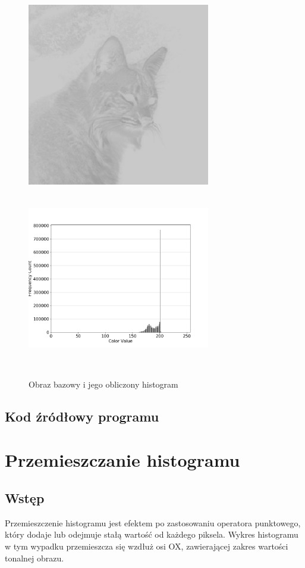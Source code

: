 \documentclass[a4paper,12pt]{book}
\begin{document}
\begin{figure}[H]
	\label{fig:cat-bright-histogram}
	\caption{Obraz bazowy i jego obliczony histogram}
	\includegraphics[width=8cm, height=8cm]{cat-bright-unmodified.png}
	\includegraphics[width=8cm, height=8cm]{5-1/calculate-cat-bright.png}
\end{figure}

\subsection*{Kod źródłowy programu}

\section{Przemieszczanie histogramu}
\subsection*{Wstęp}
Przemieszczenie histogramu jest efektem po zastosowaniu operatora punktowego, który dodaje lub odejmuje stałą wartość od każdego piksela. Wykres histogramu w tym wypadku przemieszcza się wzdłuż osi OX, zawierającej zakres wartości tonalnej obrazu. 
\end{document}
